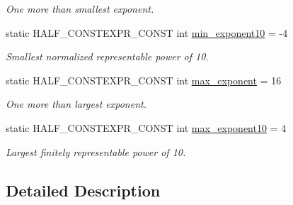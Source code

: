 \begin{DoxyCompactItemize}
\begin{DoxyCompactList}\small\item\em One more than smallest exponent. \end{DoxyCompactList}\item 
static H\+A\+L\+F\+\_\+\+C\+O\+N\+S\+T\+E\+X\+P\+R\+\_\+\+C\+O\+N\+ST int \hyperlink{classstd_1_1numeric__limits_3_01half__float_1_1half_01_4_ac8e5727691c06e4ee4fc124e7567edc3}{min\+\_\+exponent10} = -\/4\hypertarget{classstd_1_1numeric__limits_3_01half__float_1_1half_01_4_ac8e5727691c06e4ee4fc124e7567edc3}{}\label{classstd_1_1numeric__limits_3_01half__float_1_1half_01_4_ac8e5727691c06e4ee4fc124e7567edc3}

\begin{DoxyCompactList}\small\item\em Smallest normalized representable power of 10. \end{DoxyCompactList}\item 
static H\+A\+L\+F\+\_\+\+C\+O\+N\+S\+T\+E\+X\+P\+R\+\_\+\+C\+O\+N\+ST int \hyperlink{classstd_1_1numeric__limits_3_01half__float_1_1half_01_4_a41f49d6fa628325afbe7870b0ce945c2}{max\+\_\+exponent} = 16\hypertarget{classstd_1_1numeric__limits_3_01half__float_1_1half_01_4_a41f49d6fa628325afbe7870b0ce945c2}{}\label{classstd_1_1numeric__limits_3_01half__float_1_1half_01_4_a41f49d6fa628325afbe7870b0ce945c2}

\begin{DoxyCompactList}\small\item\em One more than largest exponent. \end{DoxyCompactList}\item 
static H\+A\+L\+F\+\_\+\+C\+O\+N\+S\+T\+E\+X\+P\+R\+\_\+\+C\+O\+N\+ST int \hyperlink{classstd_1_1numeric__limits_3_01half__float_1_1half_01_4_aed5c9a3c44d6e9e6949926674648d7ce}{max\+\_\+exponent10} = 4\hypertarget{classstd_1_1numeric__limits_3_01half__float_1_1half_01_4_aed5c9a3c44d6e9e6949926674648d7ce}{}\label{classstd_1_1numeric__limits_3_01half__float_1_1half_01_4_aed5c9a3c44d6e9e6949926674648d7ce}

\begin{DoxyCompactList}\small\item\em Largest finitely representable power of 10. \end{DoxyCompactList}\end{DoxyCompactItemize}


\subsection{Detailed Description}
